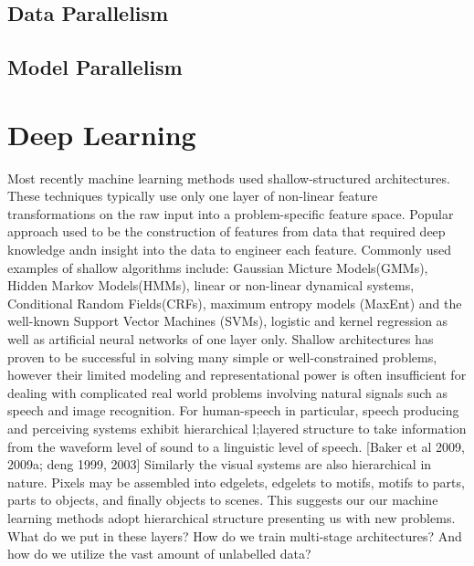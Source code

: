     
    
        \subsection{Data Parallelism}
        
        
        
        \subsection{Model Parallelism}
        
        
        
\section{Deep Learning}



Most recently machine learning methods used shallow-structured architectures.
These techniques typically use only one layer of non-linear feature transformations on the raw input into a problem-specific feature space.
Popular approach used to be the construction of features from data that required deep knowledge andn insight into the data to engineer each feature\citep{bengio2009advances}.
Commonly used examples of shallow algorithms include:
Gaussian Micture Models(GMMs), Hidden Markov Models(HMMs), linear or non-linear dynamical systems, Conditional Random Fields(CRFs), maximum entropy models (MaxEnt) and the well-known Support Vector Machines (SVMs), logistic and kernel regression as well as artificial neural networks of one layer only\citep{dengthree}.
Shallow architectures has proven to be successful  in solving many simple or well-constrained problems, however their limited modeling and representational power is often insufficient for dealing with complicated real world problems involving natural signals such as speech and image recognition\citep{dengthree}.
For human-speech in particular, speech producing and perceiving systems exhibit hierarchical l;layered structure to take information from the waveform level of sound to a linguistic level of speech.
[Baker et al 2009, 2009a; deng 1999, 2003]
Similarly the visual systems are also hierarchical in nature.
Pixels may be assembled into edgelets, edgelets to motifs, motifs to parts, parts to objects, and finally objects to scenes\citep{lecun2010convolutional}.
This suggests our our machine learning methods adopt hierarchical structure presenting us with new problems.
What do we put in these layers?
How do we train multi-stage architectures?
And how do we utilize the vast amount of unlabelled data?


